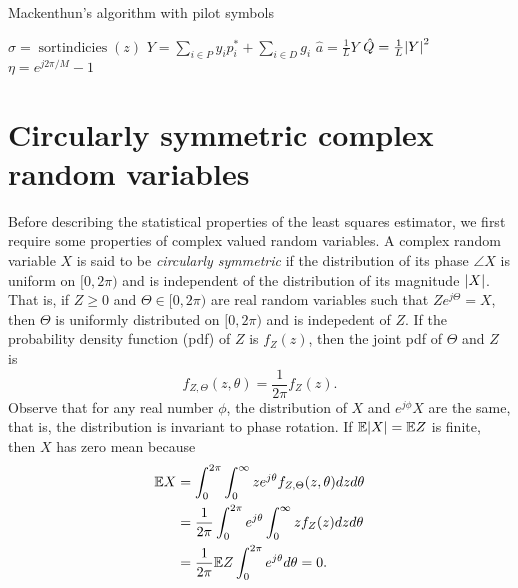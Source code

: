 \documentclass[journal]{IEEEtran}
\begin{document}
\begin{algorithm}[t] \label{alg:loglinear}
\SetAlCapFnt{\small}
\SetAlTitleFnt{}
\caption{Mackenthun's algorithm with pilot symbols}
\DontPrintSemicolon
{}
$\sigma = \operatorname{sortindicies}(z)$  \;
$Y = \sum_{i \in P} y_i p_i^* + \sum_{i \in D} g_i $ \;
$\hat{a} = \frac{1}{L} Y$ \;
$\hat{Q} = \frac{1}{L}{\left\vert Y \right\vert}^2$  \;
$\eta = e^{j2\pi/M} - 1$ \;
\end{algorithm}


\section{Circularly symmetric complex random variables}\label{sec:circ-symm-compl}

Before describing the statistical properties of the least squares estimator, we first require some properties of complex valued random variables.  A complex random variable $X$ is said to be \emph{circularly symmetric} if the distribution of its phase $\angle{X}$ is uniform on $[0,2\pi)$ and is independent of the distribution of its magnitude ${\left\vert X \right\vert}$.  That is, if $Z \geq 0$ and $\Theta \in [0,2\pi)$ are real random variables such that $Ze^{j\Theta} = X$, then $\Theta$ is uniformly distributed on $[0,2\pi)$ and is indepedent of $Z$.  If the probability density function (pdf) of $Z$ is $f_Z(z)$, then the joint pdf of $\Theta$ and $Z$ is 
\[
f_{Z,\Theta}(z,\theta) = \frac{1}{2\pi}f_Z(z).
\]  
Observe that for any real number $\phi$, the distribution of $X$ and $e^{j\phi}X$ are the same, that is, the distribution is invariant to phase rotation.  If ${\mathbb E}{\left\vert X \right\vert} = {\mathbb E} Z$ is finite, then $X$ has zero mean because
\begin{align*}
{\mathbb E} X &= \int_{0}^{2\pi} \int_{0}^\infty z e^{j\theta} f_{Z,\Theta}(z,\theta) dz d\theta \\
&= \frac{1}{2\pi} \int_{0}^{2\pi} e^{j\theta} \int_{0}^\infty z f_Z(z) dz d\theta \\
&= \frac{1}{2\pi}{\mathbb E} Z \int_{0}^{2\pi} e^{j\theta} d\theta = 0.
\end{align*}
\end{document}
